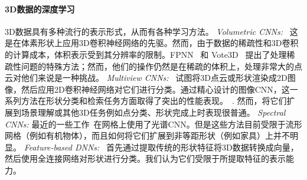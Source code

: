 \paragraph{3D数据的深度学习}

3D数据具有多种流行的表示形式，从而有各种学习方法。
\emph{Volumetric CNNs:}~\cite{wu20153d, maturana2015voxnet, qi2016volumetric} 这是在体素形状上应用3D卷积神经网络的先驱。然而，由于数据的稀疏性和3D卷积的计算成本，体积表示受到其分辨率的限制。FPNN~\cite{li2016fpnn} 和 Vote3D~\cite{wang2015voting} 提出了处理稀疏性问题的特殊方法；然而，他们的操作仍然是在稀疏的体积上，处理非常大的点云对他们来说是一种挑战。
\emph{Multiview CNNs:}~\cite{su15mvcnn, qi2016volumetric} 试图将3D点云或形状渲染成2D图像，然后应用2D卷积神经网络对它们进行分类。通过精心设计的图像CNN，这一系列方法在形状分类和检索任务方面取得了突出的性能表现。~\cite{savvashrec}. 然而，将它们扩展到场景理解或其他3D任务例如点分类、形状完成上时表现很普通。
\emph{Spectral CNNs:} 最近的一些工作~\cite{bruna2013spectral, masci2015geodesic}在网格上使用了光谱CNN。但是这些方法目前受限于流形网格（例如有机物体），而且如何将它们扩展到非等距形状（例如家具）上并不明显。
\emph{Feature-based DNNs:}~\cite{fang20153d,guo20153d} 首先通过提取传统的形状特征将3D数据转换成向量，然后使用全连接网络对形状进行分类。我们认为它们受限于所提取特征的表示能力。






